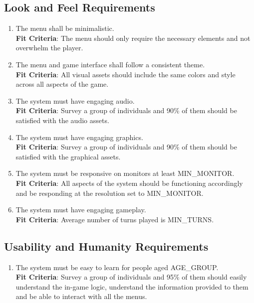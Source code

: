 \documentclass{article}
\begin{document}
\subsection{Look and Feel Requirements}
\begin{enumerate}[{LF}1. ]
    \item The menu shall be minimalistic. \\
    \textbf{Fit Criteria}: The menu should only require the necessary elements and not overwhelm the player.
    \item The menu and game interface shall follow a consistent theme. \\
    \textbf{Fit Criteria}: All visual assets should include the same colors and style across all aspects of the game.  
    \item The system must have engaging audio. \\
    \textbf{Fit Criteria}: Survey a group of individuals and 90\% of them should be satisfied with the audio assets. 
    \item The system must have engaging graphics.\\
    \textbf{Fit Criteria}: Survey a group of individuals and 90\% of them should be satisfied with the graphical assets.
    \item The system must be responsive on monitors at least MIN\_MONITOR. \\
    \textbf{Fit Criteria}: All aspects of the system should be functioning accordingly and be responding at the resolution set to MIN\_MONITOR.
    \item The system must have engaging gameplay. \\
    \textbf{Fit Criteria}: Average number of turns played is MIN\_TURNS.
    
\end{enumerate}

\subsection{Usability and Humanity Requirements}
\begin{enumerate}[{UH}1. ]
    \item The system must be easy to learn for people aged AGE\_GROUP. \\
    \textbf{Fit Criteria}: Survey a group of individuals and 95\% of them should easily understand the in-game logic, understand the information provided to them and be able to interact with all the menus.
\end{enumerate}
\end{document}
